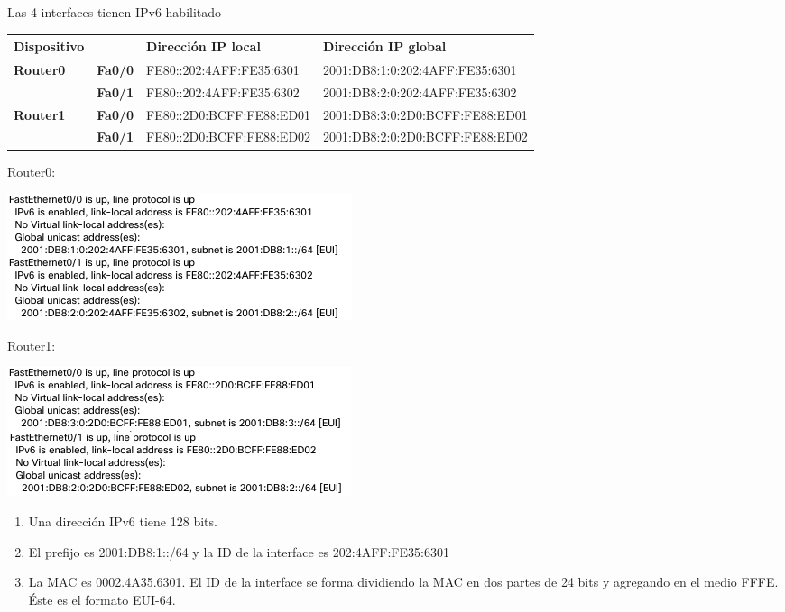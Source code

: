 \documentclass[11pt]{article}
\begin{document}
\begin{enumerate}
Las 4 interfaces tienen IPv6 habilitado
\begin{center}
\begin{tabular}{llll}
\textbf{Dispositivo} &  & \textbf{Dirección IP local} & \textbf{Dirección IP global}\\
\hline
\textbf{Router0} & \textbf{Fa0/0} & FE80::202:4AFF:FE35:6301 & 2001:DB8:1:0:202:4AFF:FE35:6301\\
 & \textbf{Fa0/1} & FE80::202:4AFF:FE35:6302 & 2001:DB8:2:0:202:4AFF:FE35:6302\\
\hline
\textbf{Router1} & \textbf{Fa0/0} & FE80::2D0:BCFF:FE88:ED01 & 2001:DB8:3:0:2D0:BCFF:FE88:ED01\\
 & \textbf{Fa0/1} & FE80::2D0:BCFF:FE88:ED02 & 2001:DB8:2:0:2D0:BCFF:FE88:ED02\\
\end{tabular}
\end{center}

Router0:
\begin{center}
\includegraphics[width=.9\linewidth]{./router0.png}
\end{center}

Router1:
\begin{center}
\includegraphics[width=.9\linewidth]{./router1.png}
\end{center}

\begin{enumerate}
\item Una dirección IPv6 tiene 128 bits.
\item El prefijo es 2001:DB8:1::/64 y la ID de la interface es 202:4AFF:FE35:6301
\item La MAC es 0002.4A35.6301. El ID de la interface se forma dividiendo la MAC en dos partes de 24 bits y agregando en el medio FFFE. Éste es el formato EUI-64.
\end{enumerate}


\end{enumerate}
\end{document}
